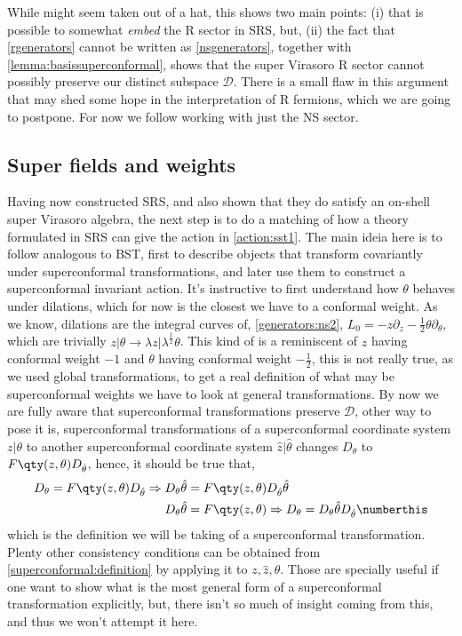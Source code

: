 While might seem taken out of a hat, this shows two main points: (i) that is possible to somewhat \textit{embed} the R sector in SRS, but, (ii) the fact that \eqref{rgenerators} cannot be written 
as \eqref{nsgenerators}, together with \cref{lemma:basissuperconformal}, shows that the super Virasoro R sector cannot possibly 
preserve our distinct subspace $\mathcal D$. There is a small flaw in this argument that may shed some hope in the interpretation of 
R fermions, which we are going to postpone. For now we follow working with just the NS sector.

\subsection{Super fields and weights}

Having now constructed SRS, and also shown that they do satisfy an on-shell super Virasoro algebra, the next step is to 
do a matching of how a theory formulated in SRS can give the action in \cref{action:sst1}. 
The main ideia here is to follow analogous to BST, first to describe objects that transform covariantly 
under superconformal transformations, and later use them to construct a superconformal invariant action. It's instructive 
to first understand how $\theta$ behaves under dilations, which for now is the closest we have to a conformal weight. 
As we know, dilations are the integral curves of, \cref{generators:ns2}, $L_0=-z\partial_z-\frac12\theta\partial_\theta$, 
which are trivially $z|\theta\rightarrow \lambda z|\lambda^{\frac12}\theta$. This kind of is a reminiscent of $z$ having 
conformal weight $-1$ and $\theta$ having conformal weight $-\frac12$, this is not really true, as we used global transformations, 
to get a real definition of what may be superconformal weights we have to look at general transformations. By now we are fully 
aware that superconformal transformations preserve $\mathcal D$, other way to pose it is, superconformal transformations of 
a superconformal coordinate system $z|\theta$ to another superconformal coordinate system $\hat z|\hat\theta$ changes $D_\theta$ to 
$F\qty(z,\theta)D_{\hat\theta}$, hence, it should be true that,
\begin{align*}
    D_\theta=F\qty(z,\theta)D_{\hat\theta}\Rightarrow D_\theta\hat\theta&=F\qty(z,\theta)D_{\hat\theta}\hat\theta\\
    D_\theta\hat\theta&=F\qty(z,\theta)\Rightarrow D_\theta=D_\theta\hat\theta D_{\hat\theta}\numberthis\label{superconformal:definition}
\end{align*}
which is the definition we will be taking of a superconformal transformation. Plenty other consistency conditions can be 
obtained from \cref{superconformal:definition} by applying it to $z,\hat z,\theta$. Those are specially useful if one want to 
show what is the most general form of a superconformal transformation explicitly, but, there isn't so much of insight coming 
from this, and thus we won't attempt it here.